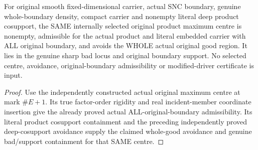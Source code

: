 \begin{theorem}
\label{hir:sharp-original-deep-product-first-centre-good-region-preserving}
\leanok
For original smooth fixed-dimensional carrier, actual SNC boundary, genuine whole-boundary density, compact carrier and nonempty literal deep product cosupport, the SAME internally selected original product maximum centre is nonempty, admissible for the actual product and literal embedded carrier with ALL original boundary, and avoids the WHOLE actual original good region. It lies in the genuine sharp bad locus and original boundary support. No selected centre, avoidance, original-boundary admissibility or modified-driver certificate is input.
\end{theorem}
\begin{proof}
Use the independently constructed actual original maximum centre at mark $\#E+1$. Its true factor-order rigidity and real incident-member coordinate insertion give the already proved actual ALL-original-boundary admissibility. Its literal product cosupport containment and the preceding independently proved deep-cosupport avoidance supply the claimed whole-good avoidance and genuine bad/support containment for that SAME centre.
\end{proof}

